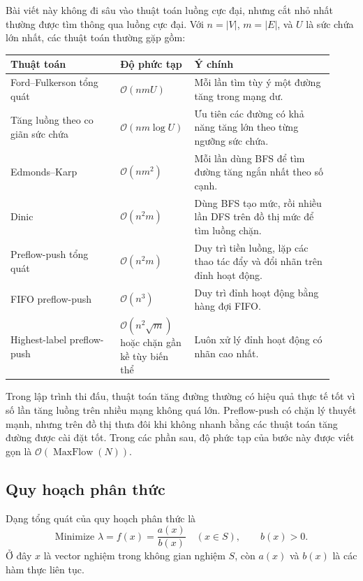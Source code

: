 \documentclass[11pt]{article}
\newcommand{\Oh}{\mathcal{O}}
\begin{document}
Bài viết này không đi sâu vào thuật toán luồng cực đại, nhưng cắt nhỏ nhất
thường được tìm thông qua luồng cực đại. Với \(n=|V|\), \(m=|E|\), và \(U\)
là sức chứa lớn nhất, các thuật toán thường gặp gồm:

\begin{center}
\begin{tabular}{>{\raggedright\arraybackslash}p{0.33\linewidth}
                >{\centering\arraybackslash}p{0.17\linewidth}
                >{\raggedright\arraybackslash}p{0.42\linewidth}}
\hline
Thuật toán & Độ phức tạp & Ý chính\\
\hline
Ford--Fulkerson tổng quát & \(\Oh(nmU)\) &
Mỗi lần tìm tùy ý một đường tăng trong mạng dư.\\
Tăng luồng theo co giãn sức chứa & \(\Oh(nm\log U)\) &
Ưu tiên các đường có khả năng tăng lớn theo từng ngưỡng sức chứa.\\
Edmonds--Karp & \(\Oh(nm^2)\) &
Mỗi lần dùng BFS để tìm đường tăng ngắn nhất theo số cạnh.\\
Dinic & \(\Oh(n^2m)\) &
Dùng BFS tạo mức, rồi nhiều lần DFS trên đồ thị mức để tìm luồng chặn.\\
Preflow-push tổng quát & \(\Oh(n^2m)\) &
Duy trì tiền luồng, lặp các thao tác đẩy và đổi nhãn trên đỉnh hoạt động.\\
FIFO preflow-push & \(\Oh(n^3)\) &
Duy trì đỉnh hoạt động bằng hàng đợi FIFO.\\
Highest-label preflow-push & \(\Oh(n^2\sqrt m)\) hoặc chặn gần kề tùy biến thể &
Luôn xử lý đỉnh hoạt động có nhãn cao nhất.\\
\hline
\end{tabular}
\end{center}

Trong lập trình thi đấu, thuật toán tăng đường thường có hiệu quả thực tế tốt
vì số lần tăng luồng trên nhiều mạng không quá lớn. Preflow-push có chặn lý
thuyết mạnh, nhưng trên đồ thị thưa đôi khi không nhanh bằng các thuật toán
tăng đường được cài đặt tốt. Trong các phần sau, độ phức tạp của bước này
được viết gọn là \(\Oh(\operatorname{MaxFlow}(N))\).

\subsection{Quy hoạch phân thức}

Dạng tổng quát của quy hoạch phân thức là
\[
  \text{Minimize }\lambda=f(x)=\frac{a(x)}{b(x)}\quad (x\in S),
  \qquad b(x)>0.
\]
Ở đây \(x\) là vector nghiệm trong không gian nghiệm \(S\), còn \(a(x)\) và
\(b(x)\) là các hàm thực liên tục.
\end{document}
